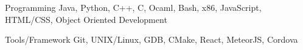 

\begin{cvskills}

  \cvskill
    {Programming} %
    {Java, Python, C++, C, Ocaml, Bash, x86, JavaScript, HTML/CSS, Object Oriented Development} %

  \cvskill
    {Tools/Framework} %
    {Git, UNIX/Linux, GDB, CMake, React, MeteorJS, Cordova} %


\end{cvskills}